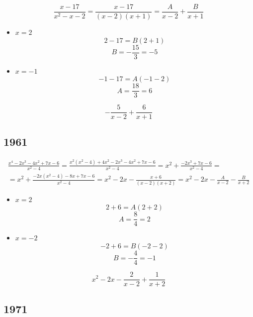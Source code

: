$$ \frac{x - 17}{x^2 - x - 2} = \frac{x - 17}{(x - 2)(x + 1)} = \frac{A}{x - 2} + \frac{B}{x + 1} $$
\begin{itemize}
	\item $ x = 2 $
    $$ 2 - 17 = B(2 + 1) $$
    $$ B = -\frac{15}3 = -5 $$
    \item $ x = -1 $
    $$ -1 - 17 = A(-1 - 2) $$
    $$ A = \frac{18}3 = 6 $$
\end{itemize}
$$ -\frac5{x - 2} + \frac6{x + 1} $$

\subsection{1961}

\begin{multline*}
    \frac{x^4 - 2x^3 - 4x^2 + 7x - 6}{x^2 - 4} = \frac{x^2(x^2 - 4) + 4x^2 - 2x^3 - 4x^2 + 7x - 6}{x^2 - 4} = x^2 + \frac{-2x^3 + 7x - 6}{x^2 - 4} = \\
    = x^2 + \frac{-2x(x^2 - 4) - 8x + 7x - 6}{x^2 - 4} = x^2 - 2x - \frac{x + 6}{(x - 2)(x + 2)} = x^2 - 2x - \frac{A}{x - 2} - \frac{B}{x + 2}
\end{multline*}
\begin{itemize}
	\item $ x = 2 $
    $$ 2 + 6 = A(2 + 2) $$
    $$ A = \frac84 = 2 $$
    \item $ x = -2 $
    $$ -2 + 6 = B(-2 - 2) $$
    $$ B = -\frac44 = -1 $$
\end{itemize}
$$ x^2 - 2x - \frac2{x - 2} + \frac1{x + 2} $$

\subsection{1971}

